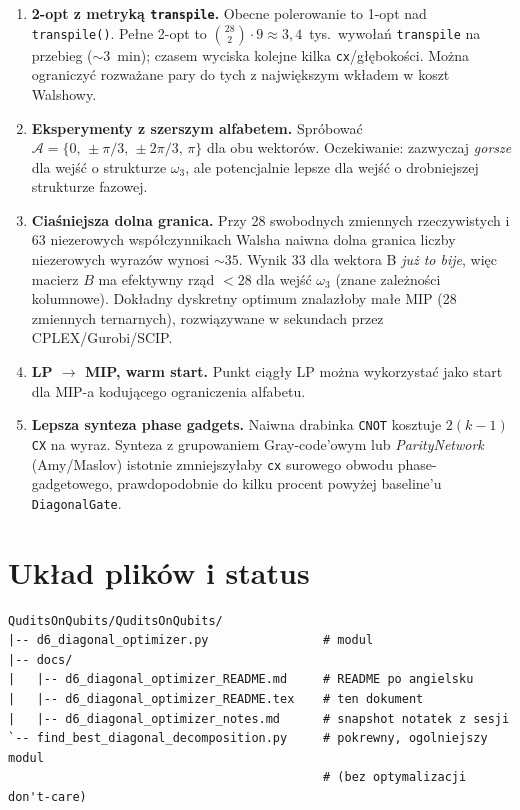 \documentclass[11pt,a4paper]{article}
\newcommand{\1}{\mathbf{1}}
\newcommand{\w}{\omega}
\newcommand{\Alphabet}{\mathcal{A}}
\newcommand{\code}[1]{\texttt{#1}}
\begin{document}
\begin{enumerate}[leftmargin=*]
  \item \textbf{2-opt z metryką \code{transpile}.} Obecne polerowanie
        to 1-opt nad \code{transpile()}. Pełne 2-opt to
        $\binom{28}{2}\cdot 9 \approx 3{,}4$~tys.\ wywołań
        \code{transpile} na przebieg ($\sim$3~min); czasem wyciska
        kolejne kilka \code{cx}/głębokości. Można ograniczyć
        rozważane pary do tych z największym wkładem w koszt Walshowy.
  \item \textbf{Eksperymenty z szerszym alfabetem.} Spróbować
        $\Alphabet=\{0,\,\pm\pi/3,\,\pm 2\pi/3,\,\pi\}$ dla obu wektorów.
        Oczekiwanie: zazwyczaj \emph{gorsze} dla wejść o strukturze
        $\w_{3}$, ale potencjalnie lepsze dla wejść o drobniejszej
        strukturze fazowej.
  \item \textbf{Ciaśniejsza dolna granica.} Przy 28 swobodnych
        zmiennych rzeczywistych i 63 niezerowych współczynnikach
        Walsha naiwna dolna granica liczby niezerowych wyrazów
        wynosi $\sim 35$. Wynik 33 dla wektora B \emph{już to bije},
        więc macierz $B$ ma efektywny rząd $<28$ dla wejść
        $\w_{3}$ (znane zależności kolumnowe). Dokładny dyskretny
        optimum znalazłoby małe MIP (28 zmiennych ternarnych),
        rozwiązywane w sekundach przez CPLEX/Gurobi/SCIP.
  \item \textbf{LP $\to$ MIP, warm start.} Punkt ciągły LP można
        wykorzystać jako start dla MIP-a kodującego ograniczenia
        alfabetu.
  \item \textbf{Lepsza synteza phase gadgets.} Naiwna drabinka
        \code{CNOT} kosztuje $2(k-1)$ \code{CX} na wyraz. Synteza
        z grupowaniem Gray-code'owym lub \emph{ParityNetwork}
        (Amy/Maslov) istotnie zmniejszyłaby \code{cx} surowego
        obwodu phase-gadgetowego, prawdopodobnie do kilku procent
        powyżej baseline'u \code{DiagonalGate}.
\end{enumerate}

\section{Układ plików i status}
\label{sec:layout}

\begin{lstlisting}
QuditsOnQubits/QuditsOnQubits/
|-- d6_diagonal_optimizer.py                # modul
|-- docs/
|   |-- d6_diagonal_optimizer_README.md     # README po angielsku
|   |-- d6_diagonal_optimizer_README.tex    # ten dokument
|   |-- d6_diagonal_optimizer_notes.md      # snapshot notatek z sesji
`-- find_best_diagonal_decomposition.py     # pokrewny, ogolniejszy modul
                                            # (bez optymalizacji don't-care)
\end{lstlisting}
\end{document}
